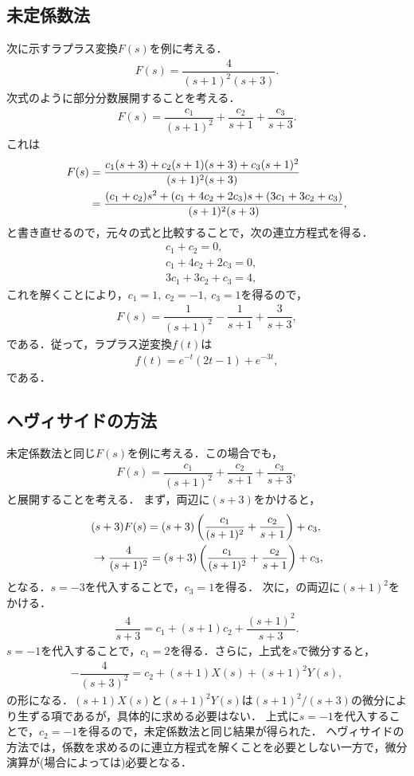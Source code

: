 \subsection{未定係数法}
%
次に示すラプラス変換$F(s)$を例に考える．
\begin{align}
 F(s) = \dfrac{4}{(s+1)^2(s+3)}. 
\end{align}
%
次式のように部分分数展開することを考える．
\begin{align}
 F(s) = \dfrac{c_1}{(s+1)^2} + \dfrac{c_2}{s+1} + \dfrac{c_3}{s+3}. 
\end{align}
%
これは
\begin{align}
 F(s) &= \dfrac{c_1(s+3)+c_2(s+1)(s+3) + c_3(s+1)^2}{(s+1)^2(s+3)} \notag \\
      &= \dfrac{(c_1+c_2)s^2+(c_1+4c_2+2c_3)s+(3c_1+3c_2+c_3)}{(s+1)^2(s+3)}, 
\end{align}
と書き直せるので，元々の式と比較することで，次の連立方程式を得る．
\begin{align}
  &c_1  +  c_2 = 0, \\
  &c_1  + 4c_2 + 2 c_3 = 0, \\
  &3c_1 + 3c_2 +   c_3 = 4, 
\end{align}
これを解くことにより，$c_1=1,~c_2=-1,~c_3=1$を得るので，
\begin{align}
 F(s) = \dfrac{1}{(s+1)^2} - \dfrac{1}{s+1} + \dfrac{3}{s+3}, 
\end{align}
である．従って，ラプラス逆変換$f(t)$は
\begin{align}
 f(t) = e^{-t}(2t - 1) + e^{-3t}, 
\end{align}
である．
%
\subsection{ヘヴィサイドの方法}
%
未定係数法と同じ$F(s)$を例に考える．この場合でも，
\begin{align}
 F(s) = \dfrac{c_1}{(s+1)^2} + \dfrac{c_2}{s+1} + \dfrac{c_3}{s+3}, \label{pfe_ex01} 
\end{align}
と展開することを考える．
まず，両辺に$(s+3)$をかけると，
\begin{align}
 &             (s+3)F(s)          = (s+3)\left(\dfrac{c_1}{(s+1)^2}+\dfrac{c_2}{s+1}\right) + c_3, \notag \\
 &\rightarrow  \dfrac{4}{(s+1)^2} = (s+3)\left(\dfrac{c_1}{(s+1)^2}+\dfrac{c_2}{s+1}\right) + c_3,
\end{align}
となる．$s=-3$を代入することで，$c_3=1$を得る．
次に，の両辺に$(s+1)^2$をかける．
\begin{align}
 \dfrac{4}{s+3} = c_1 + (s+1)c_2 + \dfrac{(s+1)^2}{s+3}. \label{pfe_ex01_heav01} 
\end{align}
$s=-1$を代入することで，$c_1 = 2$を得る．さらに，上式を$s$で微分すると，
\begin{align}
 -\dfrac{4}{(s+3)^2} = c_2 + (s+1)X(s) + (s+1)^2 Y(s), 
\end{align}
の形になる．$(s+1)X(s)$と$(s+1)^2Y(s)$は$(s+1)^2/(s+3)$の微分により生ずる項であるが，具体的に求める必要はない．
上式に$s=-1$を代入することで，$c_2 = -1$を得るので，未定係数法と同じ結果が得られた．
ヘヴィサイドの方法では，係数を求めるのに連立方程式を解くことを必要としない一方で，微分演算が(場合によっては)必要となる．

